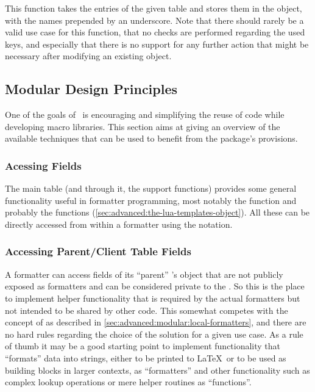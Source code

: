 \documentclass[12pt]{scrartcl}
\begin{document}
This function takes the entries of the given table and stores them in the
 object, with the names prepended by an underscore. Note that
there should rarely be a valid use case for this function, that no checks are
performed regarding the used keys, and especially that there is no support for
any further action that might be necessary after modifying an existing
 object.


\subsection{Modular Design Principles}
\label{sec:advanced:modular-design-principles}

One of the goals of \luaformatters\ is encouraging and simplifying the reuse of
code while developing macro libraries.  This section aims at giving an overview
of the available techniques that can be used to benefit from the package's
provisions.


\subsubsection{Acessing  Fields}
\label{sec:advanced:modular:lua-templates-fields}

The main table  (and through it, the support functions)
provides some general functionality useful in formatter programming, most
notably the  function and probably the 
functions (\vref{sec:advanced:the-lua-templates-object}).  All these can be
directly accessed from within a formatter using the  notation.


\subsubsection{Accessing Parent/Client Table Fields}
\label{sec:advanced:modular:parent-table}

A formatter can access fields of its “parent” 's
 object that are not publicly exposed as formatters and
can be considered private to the . So this is the place to
implement helper functionality that is required by the actual formatters but not
intended to be shared by other code.  This somewhat competes with the concept of
 as described in
\vref{sec:advanced:modular:local-formatters}, and there are no hard rules
regarding the choice of the solution for a given use case.  As a rule of thumb it may be a good starting point to implement functionality that “formats” data into strings, either to be printed to \LaTeX\ or to be used as building blocks in larger contexts, as “formatters” and other functionality such as complex lookup operations or mere helper routines as “functions”.
\end{document}
